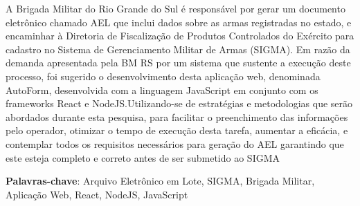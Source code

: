 \setlength{\absparsep}{18pt} %
\begin{resumo}
	A Brigada Militar do Rio Grande do Sul é responsável por gerar um documento eletrônico chamado AEL que inclui dados sobre as armas registradas no estado, e encaminhar à Diretoria de Fiscalização de Produtos Controlados do Exército para cadastro no Sistema de Gerenciamento Militar de Armas (SIGMA). Em razão da demanda apresentada
	pela BM RS por um sistema que sustente a execução deste processo, foi sugerido o desenvolvimento desta aplicação web, denominada AutoForm, desenvolvida com a linguagem JavaScript
	em conjunto com os frameworks React e NodeJS.Utilizando-se de estratégias e metodologias
	que serão abordados durante esta pesquisa, para facilitar o preenchimento das informações pelo
	operador, otimizar o tempo de execução desta tarefa, aumentar a eficácia, e contemplar todos os
	requisitos necessários para geração do AEL garantindo que este esteja completo e correto antes
	de ser submetido ao SIGMA

	
	\textbf{Palavras-chave}: Arquivo Eletrônico em Lote, SIGMA, Brigada Militar, Aplicação Web, React, NodeJS,  JavaScript  %
\end{resumo}